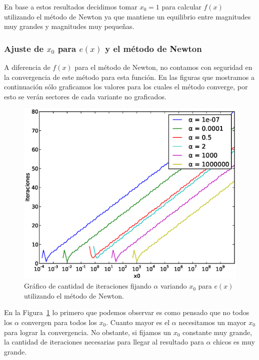 En base a estos resultados decidimos tomar $x_0 = 1$ para calcular $f(x)$
utilizando el método de Newton ya que mantiene un equilibrio entre magnitudes
muy grandes y magnitudes muy pequeñas.

\subsubsection{Ajuste de $x_0$ para $e(x)$ y el método de Newton}

A diferencia de $f(x)$ para el método de Newton, no contamos con seguridad en
la convergencia de este método para esta función. En las figuras que mostramos
a continuación sólo graficamos los valores para los cuales el método converge,
por esto se verán sectores de cada variante no graficados.

\begin{figure}[!htbp]
  \begin{center}
    \includegraphics[scale=0.5]{graficos/new/e_newton_x0_variable.eps}
    \caption{\label{fig:e_newton_x0_variable} Gráfico de cantidad de iteraciones fijando $\alpha$ variando $x_0$ para $e(x)$ utilizando el método de Newton.}
  \end{center}
\end{figure}

En la Figura~\ref{fig:e_newton_x0_variable} lo primero que podemos observar es
como pensado que no todos los $\alpha$ convergen para todos los $x_0$. Cuanto
mayor es el $\alpha$ necesitamos un mayor $x_0$ para lograr la convergencia. No
obstante, si fijamos un $x_0$ constante muy grande, la cantidad de iteraciones
necesarias para llegar al resultado para $\alpha$ chicos es muy grande.\\

